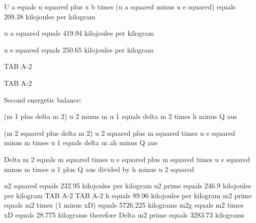 U a equals u squared plus x b times (u a squared minus u e squared) equals 209.38 kilojoules per kilogram

u a squared equals 419.94 kilojoules per kilogram

u e squared equals 250.65 kilojoules per kilogram

TAB A-2

TAB A-2

Second energetic balance:

(m 1 plus delta m 2) u 2 minus m u 1 equals delta m 2 times h minus Q aus

(m 2 squared plus delta m 2) u 2 squared plus m squared times u e squared minus m times u 1 equals delta m ah minus Q aus

Delta m 2 equals m squared times u e squared plus m squared times u e squared minus m times u 1 plus Q aus divided by h minus u 2 squared

u2 squared equals 232.95 kilojoules per kilogram  
u2 prime equals 246.9 kilojoules per kilogram  
TAB A-2  
TAB A-2  
h equals 89.96 kilojoules per kilogram  
m2 prime equals m2 times (1 minus xD) equals 5726.225 kilograms  
m2g equals m2 times xD equals 28.775 kilograms  
therefore Delta m2 prime equals 3283.73 kilograms